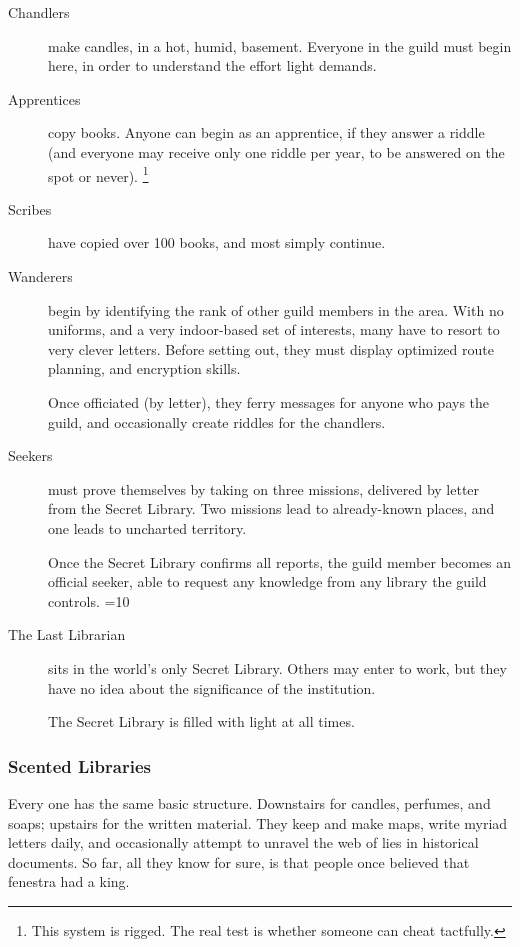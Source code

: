 \begin{multicols}{2}
\begin{description}
  \item[Chandlers]
  make candles, in a hot, humid, basement.
  Everyone in the guild must begin here, in order to understand the effort light demands.
  \item[Apprentices]
  copy books.
  Anyone can begin as an apprentice, if they answer a riddle (and everyone may receive only one riddle per year, to be answered on the spot or never).%
  \footnote{This system is rigged. The real test is whether someone can cheat tactfully.}
  \item[Scribes]
  have copied over 100 books, and most simply continue.
  \item[Wanderers]
  \label{knowledgeWanderer}%
  begin by identifying the rank of other guild members in the area.
  With no uniforms, and a very indoor-based set of interests, many have to resort to very clever letters.
  Before setting out, they must display optimized route planning, and encryption skills.

  Once officiated (by letter), they ferry messages for anyone who pays the guild, and occasionally create riddles for the chandlers.
  \item[Seekers]
  must prove themselves by taking on three missions, delivered by letter from the Secret Library.
  Two missions lead to already-known places, and one leads to uncharted territory.

  Once the Secret Library confirms all reports, the guild member becomes an official seeker, able to request any knowledge from any library the guild controls.
  \ifnum\value{season}=10
  \item[The Last Librarian]
  sits in the world's only Secret Library.
  Others may enter to work, but they have no idea about the significance of the institution.

  The Secret Library is filled with light at all times.
  \fi
\end{description}

\subsubsection{Scented Libraries}

Every one has the same basic structure.
Downstairs for candles, perfumes, and soaps; upstairs for the written material.
They keep and make maps, write myriad letters daily, and occasionally attempt to unravel the web of lies in historical documents.
So far, all they know for sure, is that people once believed that \gls{fenestra} had a king.

\end{multicols}
